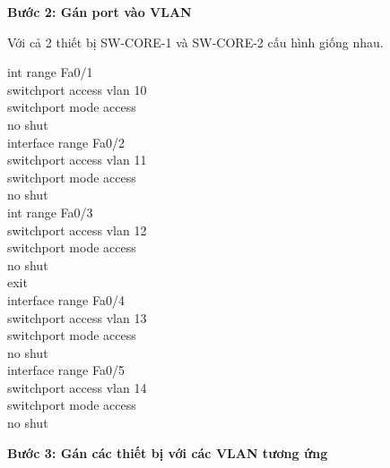 \documentclass[12pt, a4paper]{article}
\begin{document}
	\newpage
	\begin{justify}
		\textbf{Bước 2: Gán port vào VLAN}
	\end{justify}
	\begin{flushleft}
		Với cả 2 thiết bị SW-CORE-1 và SW-CORE-2 cấu hình giống nhau.
		\begin{tcolorbox}
			int range Fa0/1\\
			switchport access vlan 10\\
			switchport mode access\\
			no shut\\
			interface range Fa0/2\\
			switchport access vlan 11\\
			switchport mode access\\
			no shut\\
			int range Fa0/3\\
			switchport access vlan 12\\
			switchport mode access\\
			no shut\\
			exit\\
			interface range Fa0/4\\
			switchport access vlan 13\\
			switchport mode access\\
			no shut\\
			interface range Fa0/5\\
			switchport access vlan 14\\
			switchport mode access\\
			no shut
		\end{tcolorbox}
	\end{flushleft}
	
	\newpage
	\begin{justify}
		\textbf{Bước 3: Gán các thiết bị với các VLAN tương ứng}
	\end{justify}
	
\end{document}
